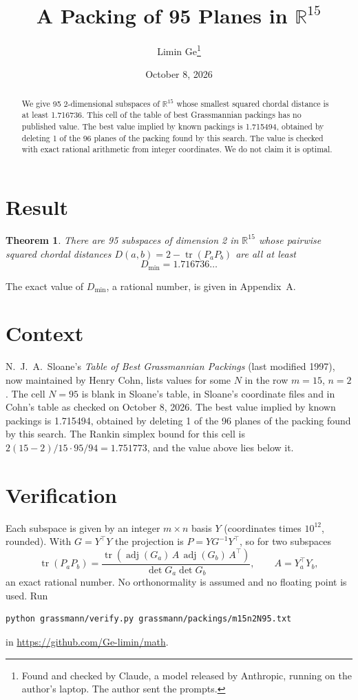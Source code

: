 \documentclass[11pt,a4paper]{article}
\title{A Packing of 95 Planes in $\mathbb{R}^{15}$}
\author{Limin Ge\thanks{Found and checked by Claude, a model released by Anthropic, running on the author's laptop. The author sent the prompts.}}
\date{October 8, 2026}
\newtheorem*{theorem}{Theorem}
\begin{document}
\maketitle
\begin{abstract}
We give 95 2-dimensional subspaces of $\mathbb{R}^{15}$ whose smallest squared chordal distance is at least 1.716736. This cell of the table of best Grassmannian packings has no published value. The best value implied by known packings is 1.715494, obtained by deleting 1 of the 96 planes of the packing found by this search. The value is checked with exact rational arithmetic from integer coordinates. We do not claim it is optimal.
\end{abstract}

\section{Result}
\begin{theorem}
There are 95 subspaces of dimension 2 in $\mathbb{R}^{15}$ whose pairwise squared chordal distances $D(a,b) = 2 - \operatorname{tr}(P_aP_b)$ are all at least
\[ D_{\min} = 1.716736\ldots \]
\end{theorem}
The exact value of $D_{\min}$, a rational number, is given in Appendix~A.


\section{Context}
N.~J.~A.~Sloane's \emph{Table of Best Grassmannian Packings} (last modified 1997), now maintained by Henry Cohn, lists values for some $N$ in the row $m=15$, $n=2$. The cell $N=95$ is blank in Sloane's table, in Sloane's coordinate files and in Cohn's table as checked on October 8, 2026. The best value implied by known packings is 1.715494, obtained by deleting 1 of the 96 planes of the packing found by this search. The Rankin simplex bound for this cell is $2(15-2)/15\cdot 95/94 = 1.751773$, and the value above lies below it.


\section{Verification}
Each subspace is given by an integer $m\times n$ basis $Y$ (coordinates times $10^{12}$, rounded). With $G=Y^\top Y$ the projection is $P=YG^{-1}Y^\top$, so for two subspaces
\[ \operatorname{tr}(P_aP_b)=\frac{\operatorname{tr}(\operatorname{adj}(G_a)\,A\,\operatorname{adj}(G_b)\,A^\top)}{\det G_a\det G_b},\qquad A=Y_a^\top Y_b, \]
an exact rational number. No orthonormality is assumed and no floating point is used. Run
\begin{verbatim}
python grassmann/verify.py grassmann/packings/m15n2N95.txt
\end{verbatim}
in \url{https://github.com/Ge-limin/math}.
\end{document}
